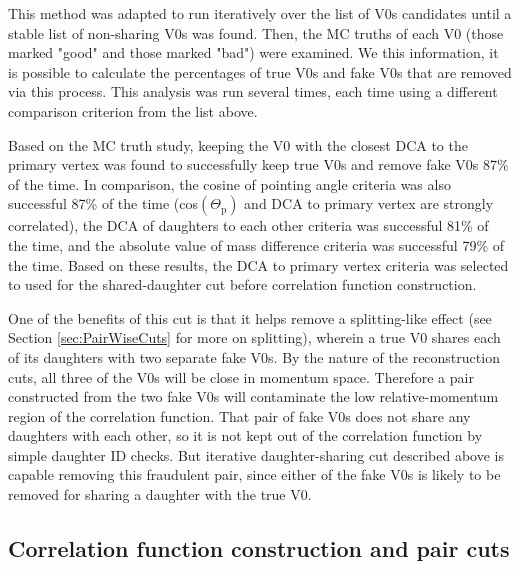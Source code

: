 This method was adapted to run iteratively over the list of V0s candidates until a stable list of non-sharing V0s was found.  Then, the MC truths of each V0 (those marked "good" and those marked "bad") were examined.  We this information, it is possible to calculate the percentages of true V0s and fake V0s that are removed via this process.  This analysis was run several times, each time using a different comparison criterion from the list above.

Based on the MC truth study, keeping the V0 with the closest DCA to the primary vertex was found to successfully keep true V0s and remove fake V0s 87\% of the time.  In comparison, the cosine of pointing angle criteria was also successful 87\% of the time (cos$(\Theta_\mathrm{p})$ and DCA to primary vertex are strongly correlated), the DCA of daughters to each other criteria was successful 81\% of the time, and the absolute value of mass difference criteria was successful 79\% of the time.   Based on these results, the DCA to primary vertex criteria was selected to used for the shared-daughter cut before correlation function construction.


One of the benefits of this cut is that it helps remove a splitting-like effect (see Section \ref{sec:PairWiseCuts} for more on splitting), wherein a true V0 shares each of its daughters with two separate fake V0s.  By the nature of the reconstruction cuts, all three of the V0s will be close in momentum space.  Therefore a pair constructed from the two fake V0s will contaminate the low relative-momentum region of the correlation function.  That pair of fake V0s does not share any daughters with each other, so it is not kept out of the correlation function by simple daughter ID checks.  But iterative daughter-sharing cut described above is capable removing this fraudulent pair, since either of the fake V0s is likely to be removed for sharing a daughter with the true V0.


\subsection{Correlation function construction and pair cuts}
\label{sec:CFconstruct}

